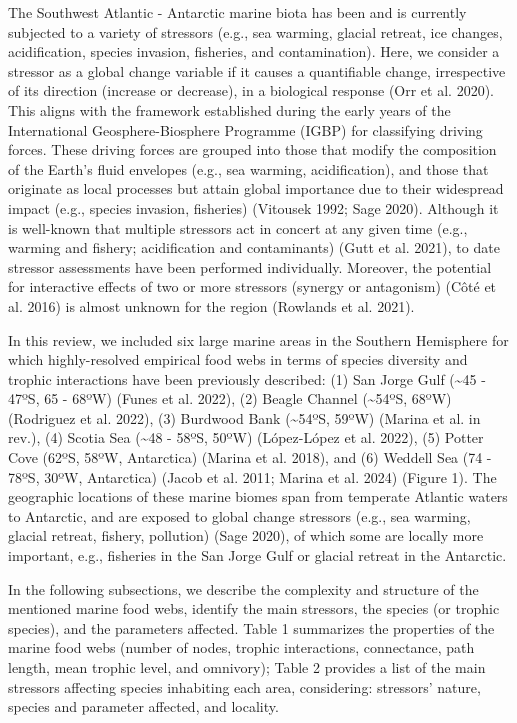 \documentclass[
]{article}
\begin{document}
The Southwest Atlantic - Antarctic marine biota has been and is
currently subjected to a variety of stressors (e.g., sea warming,
glacial retreat, ice changes, acidification, species invasion,
fisheries, and contamination). Here, we consider a stressor as a global
change variable if it causes a quantifiable change, irrespective of its
direction (increase or decrease), in a biological response (Orr et al.
2020). This aligns with the framework established during the early years
of the International Geosphere-Biosphere Programme (IGBP) for
classifying driving forces. These driving forces are grouped into those
that modify the composition of the Earth's fluid envelopes (e.g., sea
warming, acidification), and those that originate as local processes but
attain global importance due to their widespread impact (e.g., species
invasion, fisheries) (Vitousek 1992; Sage 2020). Although it is
well-known that multiple stressors act in concert at any given time
(e.g., warming and fishery; acidification and contaminants) (Gutt et al.
2021), to date stressor assessments have been performed individually.
Moreover, the potential for interactive effects of two or more stressors
(synergy or antagonism) (Côté et al. 2016) is almost unknown for the
region (Rowlands et al. 2021).

In this review, we included six large marine areas in the Southern
Hemisphere for which highly-resolved empirical food webs in terms of
species diversity and trophic interactions have been previously
described: (1) San Jorge Gulf (\textasciitilde45 - 47ºS, 65 - 68ºW)
(Funes et al. 2022), (2) Beagle Channel (\textasciitilde54ºS, 68ºW)
(Rodriguez et al. 2022), (3) Burdwood Bank (\textasciitilde54ºS, 59ºW)
(Marina et al. in rev.), (4) Scotia Sea (\textasciitilde48 - 58ºS, 50ºW)
(López-López et al. 2022), (5) Potter Cove (62ºS, 58ºW, Antarctica)
(Marina et al. 2018), and (6) Weddell Sea (74 - 78ºS, 30ºW, Antarctica)
(Jacob et al. 2011; Marina et al. 2024) (Figure 1). The geographic
locations of these marine biomes span from temperate Atlantic waters to
Antarctic, and are exposed to global change stressors (e.g., sea
warming, glacial retreat, fishery, pollution) (Sage 2020), of which some
are locally more important, e.g., fisheries in the San Jorge Gulf or
glacial retreat in the Antarctic.

In the following subsections, we describe the complexity and structure
of the mentioned marine food webs, identify the main stressors, the
species (or trophic species), and the parameters affected. Table 1
summarizes the properties of the marine food webs (number of nodes,
trophic interactions, connectance, path length, mean trophic level, and
omnivory); Table 2 provides a list of the main stressors affecting
species inhabiting each area, considering: stressors' nature, species
and parameter affected, and locality.
\end{document}

